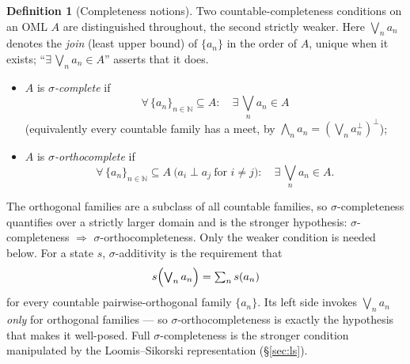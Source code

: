 \documentclass[11pt,reqno]{amsart}
\theoremstyle{plain}
\theoremstyle{definition}
\newtheorem{definition}[theorem]{Definition}
\theoremstyle{remark}
\begin{document}
\begin{definition}[Completeness notions]\label{def:complete}
Two countable-completeness conditions on an OML $A$ are distinguished
throughout, the second strictly weaker. Here $\bigvee_n a_n$ denotes the
\emph{join} (least upper bound) of $\{a_n\}$ in the order of $A$, unique when
it exists; ``$\exists\,\bigvee_n a_n\in A$'' asserts that it does.
\begin{itemize}[noitemsep, topsep=2pt]
  \item $A$ is \emph{$\sigma$-complete} if
    \[
      \forall\,\{a_n\}_{n\in\mathbb N}\subseteq A:\quad
      \exists\,\textstyle\bigvee_n a_n\in A
    \]
    (equivalently every countable family has a meet, by
    $\bigwedge_n a_n=(\bigvee_n a_n^\perp)^\perp$);
  \item $A$ is \emph{$\sigma$-orthocomplete} if
    \[
      \forall\,\{a_n\}_{n\in\mathbb N}\subseteq A
      \ \bigl(a_i\perp a_j\ \text{for } i\neq j\bigr):\quad
      \exists\,\textstyle\bigvee_n a_n\in A.
    \]
\end{itemize}
The orthogonal families are a subclass of all countable families, so
$\sigma$-completeness quantifies over a strictly larger domain and is the
stronger hypothesis: $\sigma$-completeness $\Rightarrow$ $\sigma$-orthocompleteness.
Only the weaker condition is needed below. For a state $s$,
$\sigma$-additivity is the requirement that
\[
  s\Bigl(\textstyle\bigvee_n a_n\Bigr)=\sum_n s(a_n)
\]
for every countable pairwise-orthogonal family $\{a_n\}$. Its left side invokes
$\bigvee_n a_n$ \emph{only} for orthogonal families ---
so $\sigma$-orthocompleteness is exactly the hypothesis that makes it
well-posed. Full $\sigma$-completeness is the stronger condition manipulated
by the Loomis--Sikorski representation (\S\ref{sec:ls}).
\end{definition}
\end{document}
